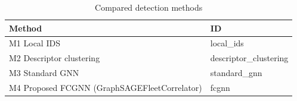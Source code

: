 \begin{table}[t]
\centering
\begin{tabular}{ll}
\toprule
Method & ID \\
\midrule
M1 Local IDS & local\_ids \\
M2 Descriptor clustering & descriptor\_clustering \\
M3 Standard GNN & standard\_gnn \\
M4 Proposed FCGNN (GraphSAGEFleetCorrelator) & fcgnn \\
\bottomrule
\end{tabular}
\caption{Compared detection methods}
\label{tab:experimental_design_methods}
\end{table}
